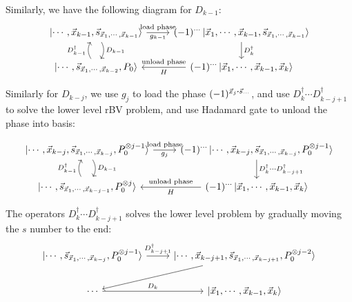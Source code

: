 \documentclass{article}
\begin{document}
Similarly, we have the following diagram for $D_{k-1}$:
\begin{equation}
\begin{tikzcd}
  \ket{\cdots,\vec{x}_{k-1},\vec{s}_{\vec{x}_1,\cdots,\vec{x}_{k-1}}} 
  \arrow[r, "\text{load phase}", "g_{k-1}" below,]
  \dar[bend left, "D_{k-1}"]
  & 
  (-1)^{\cdots} \ket{\vec{x}_1,\cdots,\vec{x}_{k-1},\vec{s}_{\vec{x}_1,\cdots,\vec{x}_{k-1}}}
  \dar["D^\dagger_k"]
  \\
  \ket{\cdots,\vec{s}_{\vec{x}_1,\cdots,\vec{x}_{k-2}},P_0}
  \uar[bend left, "D^\dagger_{k-1}"]
  &
  (-1)^{\cdots} \ket{\vec{x}_1,\cdots,\vec{x}_{k-1},\vec{x}_{k}}
  \lar["\text{unload phase}" above, "H"]
\end{tikzcd}
\end{equation}

Similarly for $D_{k-j}$, we use $g_j$ to load the phase 
$(-1)^{\vec{x}_j\vdot \vec{s}_{\cdots}}$, and use $D^\dagger_k\cdots
D^\dagger_{k-j+1}$ to solve the lower level rBV problem, and use Hadamard gate
to unload the phase into basis:

\begin{equation}
\begin{tikzcd}
  \ket{\cdots,\vec{x}_{k-j},\vec{s}_{\vec{x}_1,\cdots,\vec{x}_{k-j}},P_0^{\otimes j-1}} 
  \arrow[r, "\text{load phase}", "g_j" below,]
  \dar[bend left, "D_{k-1}"]
  & 
  (-1)^{\cdots} 
  \ket{\cdots,\vec{x}_{k-j},\vec{s}_{\vec{x}_1,\cdots,\vec{x}_{k-j}},P_0^{\otimes j-1}} 
  \dar["D^\dagger_k\cdots D^\dagger_{k-j+1}"]
  \\
  \ket{\cdots,\vec{s}_{\vec{x}_1,\cdots,\vec{x}_{k-j-1}},P_0^{\otimes j}}
  \uar[bend left, "D^\dagger_{k-1}"]
  &
  (-1)^{\cdots} \ket{\vec{x}_1,\cdots,\vec{x}_{k-1},\vec{x}_{k}}
  \lar["\text{unload phase}" above, "H"]
\end{tikzcd}
\end{equation}

The operators $D^\dagger_k\cdots D^\dagger_{k-j+1}$ solves the lower level
problem by gradually moving the $s$ number to the end:
\begin{equation}
\begin{tikzcd}
  \ket{\cdots,\vec{s}_{\vec{x}_1,\cdots,\vec{x}_{k-j}},P_0^{\otimes j-1}}
  \rar["D^\dagger_{k-j+1}"]
  &
  \ket{\cdots,\vec{x}_{k-j+1}, \vec{s}_{\vec{x}_1,\cdots,\vec{x}_{k-j+1}},P_0^{\otimes j-2}}
  \ar[ld]
  \\
  \cdots \rar["D_k"]
  &
  \ket{\vec{x}_1,\cdots,\vec{x}_{k-1},\vec{x}_{k}}
\end{tikzcd}
\end{equation}
\end{document}
